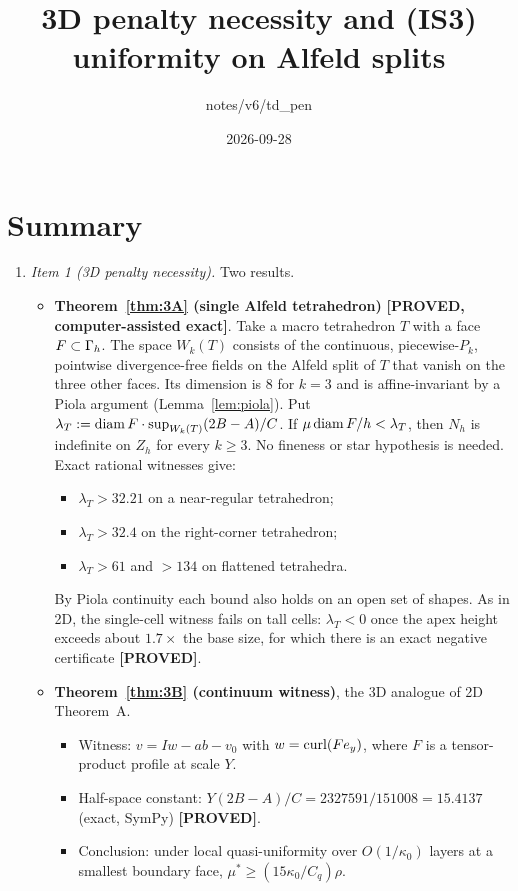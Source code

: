 \documentclass[11pt]{article}
\title{3D penalty necessity and (IS3) uniformity on Alfeld splits}\date{2026-09-28}\author{notes/v6/td\_pen}
\theoremstyle{remark}\newtheorem{remark}[theorem]{Remark}
\newcommand{\lab}[1]{\textbf{[#1]}}
\begin{document}
\maketitle

\section*{Summary}
\begin{enumerate}[label=(\arabic*)]
\item \emph{Item 1 (3D penalty necessity).} Two results.
 \begin{itemize}
 \item \textbf{Theorem~\ref{thm:3A} (single Alfeld tetrahedron)} \lab{PROVED, computer-assisted exact}.
 Take a macro tetrahedron $T$ with a face $F\subset\Gamma_h$. The space $W_k(T)$ consists of the continuous, piecewise-$P_k$, pointwise divergence-free fields on the Alfeld split of $T$ that vanish on the three other faces. Its dimension is $8$ for $k=3$ and is affine-invariant by a Piola argument (Lemma~\ref{lem:piola}). Put $\lambda_T:=\operatorname{diam} F\cdot\sup_{W_k(T)}(2B-A)/C$. If $\mu\operatorname{diam} F/h<\lambda_T$, then $N_h$ is indefinite on $Z_h$ for every $k\ge3$. No fineness or star hypothesis is needed. Exact rational witnesses give:
 \begin{itemize}
 \item $\lambda_T>32.21$ on a near-regular tetrahedron;
 \item $\lambda_T>32.4$ on the right-corner tetrahedron;
 \item $\lambda_T>61$ and $>134$ on flattened tetrahedra.
 \end{itemize}
 By Piola continuity each bound also holds on an open set of shapes. As in 2D, the single-cell witness fails on tall cells: $\lambda_T<0$ once the apex height exceeds about $1.7\times$ the base size, for which there is an exact negative certificate \lab{PROVED}.
 \item \textbf{Theorem~\ref{thm:3B} (continuum witness)}, the 3D analogue of 2D Theorem~A.
 \begin{itemize}
 \item Witness: $v=I w-ab-v_0$ with $w=\operatorname{curl}(F e_y)$, where $F$ is a tensor-product profile at scale $Y$.
 \item Half-space constant: $Y(2B-A)/C=2327591/151008=15.4137$ (exact, SymPy) \lab{PROVED}.
 \item Conclusion: under local quasi-uniformity over $O(1/\kappa_0)$ layers at a smallest boundary face, $\mu^\ast\ge(15\kappa_0/C_q)\rho$.

\end{itemize}
\end{itemize}
\end{enumerate}
\end{document}
